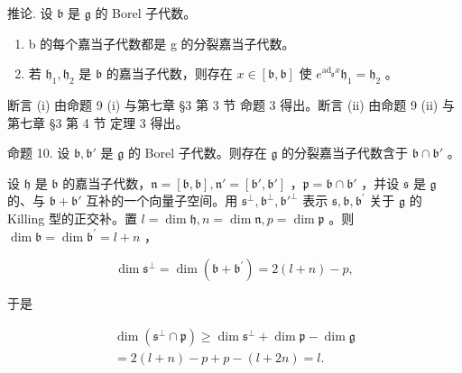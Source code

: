 推论. 设 \(\mathfrak{b}\) 是 \(\mathfrak{g}\) 的 Borel 子代数。

\begin{enumerate}
\def\labelenumi{(\roman{enumi})}
\item
  b 的每个嘉当子代数都是 g 的分裂嘉当子代数。
\item
  若 \(\mathfrak{h}_1, \mathfrak{h}_2\) 是 \(\mathfrak{b}\) 的嘉当子代数，则存在 \(x \in [\mathfrak{b}, \mathfrak{b}]\) 使 \(e^{\mathrm{ad}_{\mathfrak{g}} x} \mathfrak{h}_1 = \mathfrak{h}_2\) 。
\end{enumerate}

断言 (i) 由命题 9 (i) 与第七章 §3 第 3 节 命题 3 得出。断言 (ii) 由命题 9 (ii) 与第七章 §3 第 4 节 定理 3 得出。

命题 10. 设 \(\mathfrak{b},\mathfrak{b}'\) 是 \(\mathfrak{g}\) 的 Borel 子代数。则存在 \(\mathfrak{g}\) 的分裂嘉当子代数含于 \(\mathfrak{b} \cap \mathfrak{b}'\) 。

设 \(\mathfrak{h}\) 是 \(\mathfrak{b}\) 的嘉当子代数，\(\mathfrak{n} = [\mathfrak{b},\mathfrak{b}],\mathfrak{n}' = [\mathfrak{b}',\mathfrak{b}']\) ，\(\mathfrak{p} = \mathfrak{b}\cap \mathfrak{b}'\) ，并设 \(\mathfrak{s}\) 是 \(\mathfrak{g}\) 的、与 \(\mathfrak{b} + \mathfrak{b}'\) 互补的一个向量子空间。用 \(\mathfrak{s}^{\perp},\mathfrak{b}^{\perp},\mathfrak{b}'^{\perp}\) 表示 \(\mathfrak{s},\mathfrak{b},\mathfrak{b}^{\prime}\) 关于 \(\mathfrak{g}\) 的 Killing 型的正交补。置 \(l = \dim \mathfrak{h}, n = \dim \mathfrak{n}, p = \dim \mathfrak{p}\) 。则 \(\dim \mathfrak{b} = \dim \mathfrak{b}^{\prime} = l + n\) ，

\[
\dim \mathfrak {s} ^ {\perp} = \dim (\mathfrak {b} + \mathfrak {b} ^ {\prime}) = 2 (l + n) - p,
\]

于是

\[
\begin{array}{c} \dim (\mathfrak {s} ^ {\perp} \cap \mathfrak {p}) \geq \dim \mathfrak {s} ^ {\perp} + \dim \mathfrak {p} - \dim \mathfrak {g} \\ = 2 (l + n) - p + p - (l + 2 n) = l. \end{array}\tag{3}
\]

